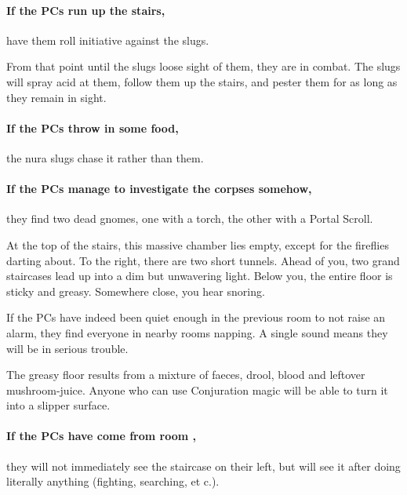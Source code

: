 \begin{multicols}{2}
\paragraph{If the PCs run up the stairs,}
have them roll initiative against the slugs.

From that point until the slugs loose sight of them, they are in combat.
The slugs will spray acid at them, follow them up the stairs, and pester them for as long as they remain in sight.

\paragraph{If the PCs throw in some food,}
the nura slugs chase it rather than them.

\paragraph{If the PCs manage to investigate the corpses somehow,}
they find two dead gnomes, one with a torch, the other with a Portal Scroll.



\begin{boxtext}

	At the top of the stairs, this massive chamber lies empty, except for the fireflies darting about.
	To the right, there are two short tunnels.
	Ahead of you, two grand staircases lead up into a dim but unwavering light.
	Below you, the entire floor is sticky and greasy.
	Somewhere close, you hear snoring.

\end{boxtext}

If the PCs have indeed been quiet enough in the previous room to not raise an alarm, they find everyone in nearby rooms napping.
A single sound means they will be in serious trouble.

The greasy floor results from a mixture of faeces, drool, blood and leftover mushroom-juice.
Anyone who can use Conjuration magic will be able to turn it into a slipper surface.

\setcounter{enc}{\value{list}}
\addtocounter{enc}{-1}

\paragraph{If the PCs have come from room ,}
they will not immediately see the staircase on their left, but will see it after doing literally anything (fighting, searching, et c.).


\end{multicols}
